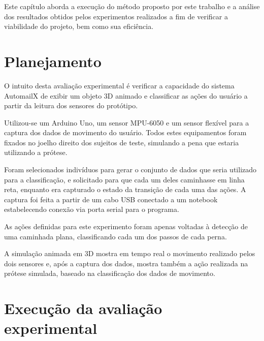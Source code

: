 Este capítulo aborda a execução do método proposto por este trabalho e a análise dos resultados obtidos pelos experimentos realizados a fim de verificar a viabilidade do projeto, bem como sua eficiência.

\section{Planejamento}\label{sec:result_planejamento}
O intuito desta avaliação experimental é verificar a capacidade do sistema AutomailX de exibir um objeto 3D animado e classificar as ações do usuário a partir da leitura dos sensores do protótipo.

 Utilizou-se um Arduino Uno, um sensor MPU-6050 e um sensor flexível para a captura dos dados de movimento do usuário. Todos estes equipamentos foram fixados  no joelho direito dos sujeitos de teste, simulando a pena que estaria utilizando a prótese.

Foram selecionados indivíduos para gerar o conjunto de dados que seria utilizado para a classificação, e solicitado para que cada um deles caminhasse em linha reta, enquanto era capturado o estado da transição de cada uma das ações. A captura foi feita a partir de um cabo USB conectado a um notebook  estabelecendo conexão via porta serial para o programa.

As ações definidas para este experimento foram apenas voltadas à detecção de uma caminhada plana, classificando cada um dos passos de cada perna.

A simulação animada em 3D mostra em tempo real o movimento realizado pelos dois sensores e, após a captura dos dados, mostra também a ação realizada na prótese simulada, baseado na classificação dos dados de movimento.

\section{Execução da avaliação experimental}\label{sec:result_execucao}

